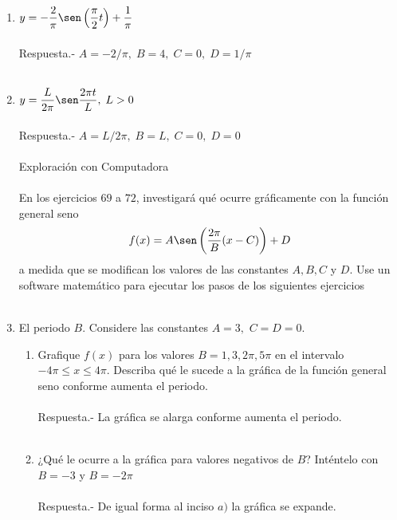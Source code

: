 \begin{enumerate}
\item $y=-\dfrac{2}{\pi} \sen\left(\dfrac{\pi}{2}t\right)+\dfrac{1}{\pi}$\\\\
    Respuesta.-\; $A=-2/\pi,\; B=4,\; C=0,\; D=1/\pi$\\\\

\item $y=\dfrac{L}{2\pi}\sen \dfrac{2\pi t}{L}, \; L>0$\\\\
    Respuesta.-\; $A=L/2\pi,\; B=L,\; C=0,\; D=0$\\\\

Exploración con Computadora\\\\

En los ejercicios $69$ a $72$, investigará qué ocurre gráficamente con la función general seno 
$$f(x)=A\sen \left(\dfrac{2\pi}{B}(x - C)\right) + D$$
a medida que se modifican los valores de las constantes $A, B, C$ y $D$. Use un software matemático para ejecutar los pasos de los siguientes ejercicios\\\\

\item El periodo $B$. Considere las constantes $A=3,$ $C=D=0$.
    \begin{enumerate}[\bfseries a)]
	
	\item Grafique $f(x)$ para los valores $B=1,3,2\pi,5\pi$ en el intervalo $-4\pi \leq x \leq 4\pi$. Describa qué le sucede a la gráfica de la función general seno conforme aumenta el periodo.\\\\
	    Respuesta.-\; La gráfica se alarga conforme aumenta el periodo.\\\\

	\item ¿Qué le ocurre a la gráfica para valores negativos de $B$? Inténtelo con $B=-3$ y $B=-2\pi$\\\\
	    Respuesta.-\; De igual forma al inciso $a)$ la gráfica se expande.\\\\ 

    \end{enumerate}


\end{enumerate}
